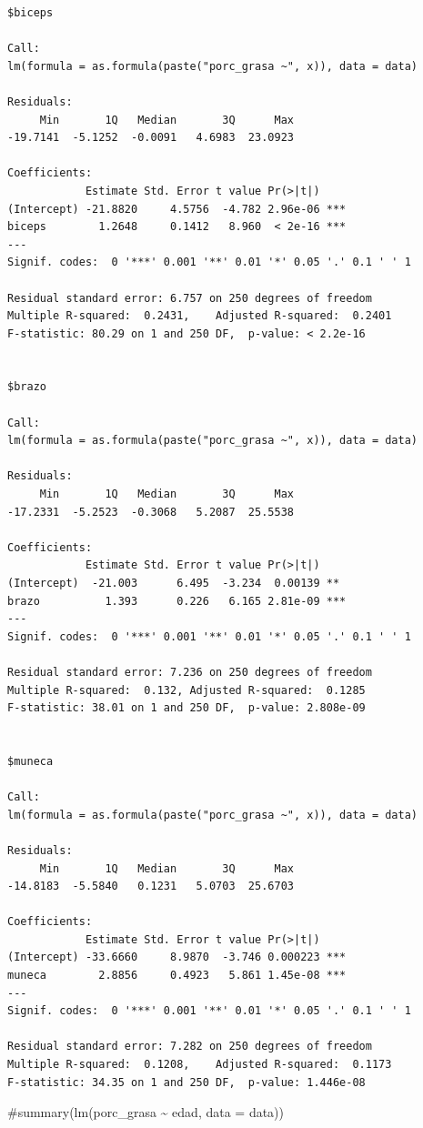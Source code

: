 \documentclass[
  letterpaper,
  DIV=11,
  numbers=noendperiod]{scrartcl}
\newenvironment{Shaded}{\begin{snugshade}}{\end{snugshade}}
\newcommand{\CommentTok}[1]{\textcolor[rgb]{0.37,0.37,0.37}{#1}}
\begin{document}
\begin{verbatim}
$biceps

Call:
lm(formula = as.formula(paste("porc_grasa ~", x)), data = data)

Residuals:
     Min       1Q   Median       3Q      Max 
-19.7141  -5.1252  -0.0091   4.6983  23.0923 

Coefficients:
            Estimate Std. Error t value Pr(>|t|)    
(Intercept) -21.8820     4.5756  -4.782 2.96e-06 ***
biceps        1.2648     0.1412   8.960  < 2e-16 ***
---
Signif. codes:  0 '***' 0.001 '**' 0.01 '*' 0.05 '.' 0.1 ' ' 1

Residual standard error: 6.757 on 250 degrees of freedom
Multiple R-squared:  0.2431,    Adjusted R-squared:  0.2401 
F-statistic: 80.29 on 1 and 250 DF,  p-value: < 2.2e-16


$brazo

Call:
lm(formula = as.formula(paste("porc_grasa ~", x)), data = data)

Residuals:
     Min       1Q   Median       3Q      Max 
-17.2331  -5.2523  -0.3068   5.2087  25.5538 

Coefficients:
            Estimate Std. Error t value Pr(>|t|)    
(Intercept)  -21.003      6.495  -3.234  0.00139 ** 
brazo          1.393      0.226   6.165 2.81e-09 ***
---
Signif. codes:  0 '***' 0.001 '**' 0.01 '*' 0.05 '.' 0.1 ' ' 1

Residual standard error: 7.236 on 250 degrees of freedom
Multiple R-squared:  0.132, Adjusted R-squared:  0.1285 
F-statistic: 38.01 on 1 and 250 DF,  p-value: 2.808e-09


$muneca

Call:
lm(formula = as.formula(paste("porc_grasa ~", x)), data = data)

Residuals:
     Min       1Q   Median       3Q      Max 
-14.8183  -5.5840   0.1231   5.0703  25.6703 

Coefficients:
            Estimate Std. Error t value Pr(>|t|)    
(Intercept) -33.6660     8.9870  -3.746 0.000223 ***
muneca        2.8856     0.4923   5.861 1.45e-08 ***
---
Signif. codes:  0 '***' 0.001 '**' 0.01 '*' 0.05 '.' 0.1 ' ' 1

Residual standard error: 7.282 on 250 degrees of freedom
Multiple R-squared:  0.1208,    Adjusted R-squared:  0.1173 
F-statistic: 34.35 on 1 and 250 DF,  p-value: 1.446e-08
\end{verbatim}

\begin{Shaded}
\begin{Highlighting}[]
\CommentTok{\#summary(lm(porc\_grasa \textasciitilde{} edad, data = data))}
\end{Highlighting}
\end{Shaded}
\end{document}
